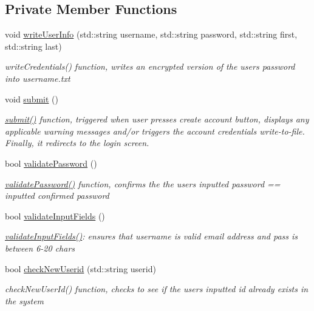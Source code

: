 \subsection*{Private Member Functions}
\begin{DoxyCompactItemize}
\item 
void \hyperlink{classCreateAccountWidget_a07718d46b3c72f481d550d6dfd4290c1}{write\+User\+Info} (std\+::string username, std\+::string password, std\+::string first, std\+::string last)
\begin{DoxyCompactList}\small\item\em write\+Credentials() function, writes an encrypted version of the user\textquotesingle{}s password into username.\+txt \end{DoxyCompactList}\item 
void \hyperlink{classCreateAccountWidget_ae55d754c8605628ff22ae06b6aa6e137}{submit} ()\hypertarget{classCreateAccountWidget_ae55d754c8605628ff22ae06b6aa6e137}{}\label{classCreateAccountWidget_ae55d754c8605628ff22ae06b6aa6e137}

\begin{DoxyCompactList}\small\item\em \hyperlink{classCreateAccountWidget_ae55d754c8605628ff22ae06b6aa6e137}{submit()} function, triggered when user presses create account button, displays any applicable warning messages and/or triggers the account credentials write-\/to-\/file. Finally, it redirects to the login screen. \end{DoxyCompactList}\item 
bool \hyperlink{classCreateAccountWidget_a96b0c9778519832be6406410f0bc3c46}{validate\+Password} ()
\begin{DoxyCompactList}\small\item\em \hyperlink{classCreateAccountWidget_a96b0c9778519832be6406410f0bc3c46}{validate\+Password()} function, confirms the the user\textquotesingle{}s inputted password == inputted confirmed password \end{DoxyCompactList}\item 
bool \hyperlink{classCreateAccountWidget_aa64703ec022e1d643011d1831c5aeae6}{validate\+Input\+Fields} ()
\begin{DoxyCompactList}\small\item\em \hyperlink{classCreateAccountWidget_aa64703ec022e1d643011d1831c5aeae6}{validate\+Input\+Fields()}\+: ensures that username is valid email address and pass is between 6-\/20 chars \end{DoxyCompactList}\item 
bool \hyperlink{classCreateAccountWidget_a485aa50d34319d8eb149d9900f40349f}{check\+New\+Userid} (std\+::string userid)
\begin{DoxyCompactList}\small\item\em check\+New\+User\+Id() function, checks to see if the user\textquotesingle{}s inputted id already exists in the system \end{DoxyCompactList}\end{DoxyCompactItemize}
